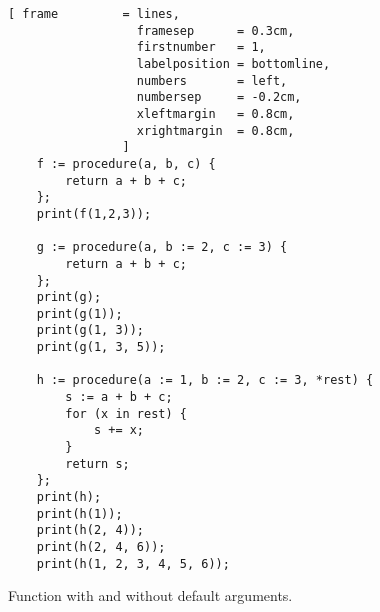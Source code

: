 \begin{figure}[!ht]
\centering
\begin{Verbatim}[ frame         = lines, 
                  framesep      = 0.3cm, 
                  firstnumber   = 1,
                  labelposition = bottomline,
                  numbers       = left,
                  numbersep     = -0.2cm,
                  xleftmargin   = 0.8cm,
                  xrightmargin  = 0.8cm,
                ]
    f := procedure(a, b, c) {
        return a + b + c;
    };
    print(f(1,2,3));
    
    g := procedure(a, b := 2, c := 3) {
        return a + b + c;
    };
    print(g);
    print(g(1));
    print(g(1, 3));
    print(g(1, 3, 5));
    
    h := procedure(a := 1, b := 2, c := 3, *rest) {
        s := a + b + c;
        for (x in rest) {
            s += x;
        }
        return s;
    };
    print(h);
    print(h(1));
    print(h(2, 4));
    print(h(2, 4, 6));
    print(h(1, 2, 3, 4, 5, 6));
\end{Verbatim}
\vspace*{-0.3cm}
\caption{Function with and without default arguments.}
\label{fig:functions.stlx}
\end{figure}

